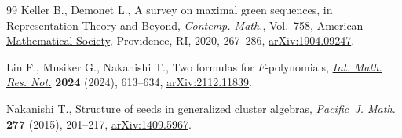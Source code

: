 \documentclass[11pt]{article}
\numberwithin{equation}{section}
\numberwithin{equation}{section}
\begin{document}
\begin{thebibliography}{99}
Keller B., Demonet L., A survey on maximal green sequences, in Representation
  {T}heory and {B}eyond, \textit{Contemp. Math.}, Vol.~758, \href{https://doi.org/10.1090/conm/758/15239}{American
  Mathematical Society}, Providence, RI, 2020, 267--286, \href{https://arxiv.org/abs/1904.09247}{arXiv:1904.09247}.

Lin F., Musiker G., Nakanishi T., Two formulas for {$F$}-polynomials,
   \href{https://doi.org/10.1093/imrn/rnad074}{\textit{Int. Math. Res. Not.}} \textbf{2024} (2024), 613--634,
  \href{https://arxiv.org/abs/2112.11839}{arXiv:2112.11839}.

Nakanishi T., Structure of seeds in generalized cluster algebras,
  \href{https://doi.org/10.2140/pjm.2015.277.201}{\textit{Pacific~J. Math.}} \textbf{277} (2015), 201--217, \href{https://arxiv.org/abs/1409.5967}{arXiv:1409.5967}.

\end{thebibliography}
\end{document}
